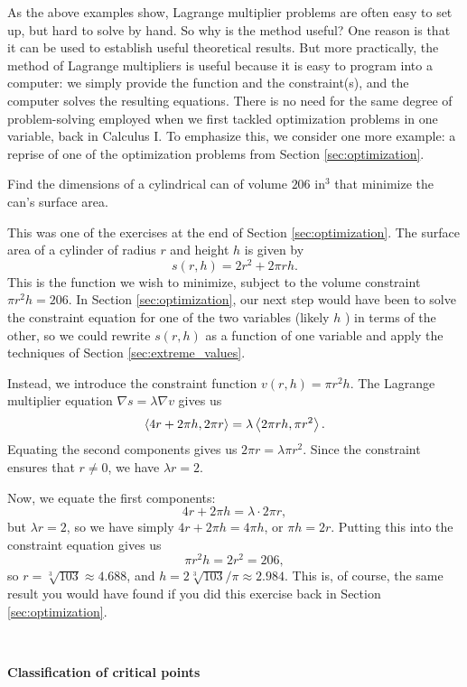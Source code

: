 As the above examples show, Lagrange multiplier problems are often easy to set up, but hard to solve by hand. So why is the method useful? One reason is that it can be used to establish useful theoretical results. But more practically, the method of Lagrange multipliers is useful because it is easy to program into a computer: we simply provide the function and the constraint(s), and the computer solves the resulting equations. There is no need for the same degree of problem-solving employed when we first tackled optimization problems in one variable, back in Calculus I. To emphasize this, we consider one more example: a reprise of one of the optimization problems from Section \ref{sec:optimization}.
\bigskip

{
Find the dimensions of a cylindrical can of volume $206 \text{ in}^3$ that minimize the can's surface area.
}
{
This was one of the exercises at the end of Section \ref{sec:optimization}. The surface area of a cylinder of radius $r$ and height $h$ is given by
\[
s(r,h) = 2r^2+2\pi rh.
\]
This is the function we wish to minimize, subject to the volume constraint $\pi r^2 h = 206$. In Section \ref{sec:optimization}, our next step would have been to solve the constraint equation for one of the two variables (likely $h$ ) in terms of the other, so we could rewrite $s(r,h)$ as a function of one variable and apply the techniques of Section \ref{sec:extreme_values}.

Instead, we introduce the constraint function $v(r,h)= \pi r^2 h$. The Lagrange multiplier equation $\nabla s = \lambda \nabla v$ gives us
\[
\left\langle 4r+2\pi h, 2\pi r\right\rangle = \lambda\left\langle 2\pi r h, \pi r^2\right\rangle.
\]
Equating the second components gives us $2\pi r = \lambda\pi r^2$. Since the constraint ensures that $r\neq 0$, we have $\lambda r = 2$.

Now, we equate the first components:
\[
4r+2\pi h = \lambda \cdot 2\pi r,
\]
but $\lambda r =2$, so we have simply $4r+2\pi h = 4\pi h$, or $\pi h = 2r$. Putting this into the constraint equation gives us
\[
\pi r^2 h = 2r^2 = 206,
\]
so $r=\sqrt[3]{103}\approx 4.688$, and $h=2\sqrt[3]{103}/\pi  \approx 2.984$. This is, of course, the same result you would have found if you did this exercise back in Section \ref{sec:optimization}.
}\\


\clearpage

\noindent\textbf{\large Classification of critical points}\\

